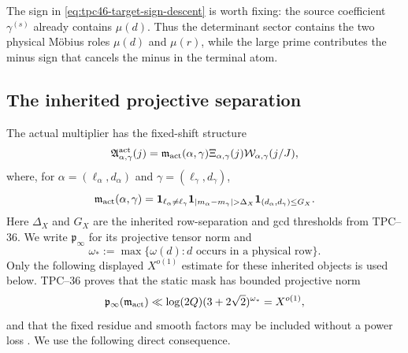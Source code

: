 The sign in \eqref{eq:tpc46-target-sign-descent} is worth fixing: the
source coefficient \(\gamma^{(s)}\) already contains \(\mu(d)\).
Thus the determinant sector contains the two physical M\"obius roles
\(\mu(d)\) and \(\mu(r)\), while the large prime contributes the
minus sign that cancels the minus in the terminal atom.

\subsection{The inherited projective separation}

The actual multiplier has the fixed-shift structure
\begin{equation}
 \mathfrak A_{\alpha,\gamma}^{\rm act}(j)
 =\mathfrak m_{\rm act}(\alpha,\gamma)
   \Xi_{\alpha,\gamma}(j)
   \mathcal W_{\alpha,\gamma}(j/J),
 \label{eq:tpc46-actual-multiplier}
\end{equation}
where, for \(\alpha=(\ell_\alpha,d_\alpha)\) and
\(\gamma=(\ell_\gamma,d_\gamma)\),
\begin{equation}
 \mathfrak m_{\rm act}(\alpha,\gamma)
 =\one_{\ell_\alpha\ne\ell_\gamma}
  \one_{|m_\alpha-m_\gamma|>\Delta_X}
 \one_{(d_\alpha,d_\gamma)\le G_X}.
 \label{eq:tpc46-static-mask}
\end{equation}
Here \(\Delta_X\) and \(G_X\) are the inherited row-separation and
gcd thresholds from TPC--36.  We write \(\mathfrak p_\infty\) for its
projective tensor norm and
\[
 \omega_*:=\max\{\omega(d):d\text{ occurs in a physical row}\}.
\]
Only the following displayed \(X^{o(1)}\) estimate for these inherited
objects is used below.
TPC--36 proves that the static mask has bounded projective norm
\begin{equation}
 \mathfrak p_\infty(\mathfrak m_{\rm act})
 \ll \log(2Q)(3+2\sqrt2)^{\omega_*}=X^{o(1)},
 \label{eq:tpc46-global-projective-cost}
\end{equation}
and that the fixed residue and smooth factors may be included without a
power loss \citep{WangTPC36}.  We use the following direct consequence.

